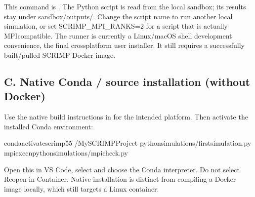 \documentclass[letterpaper,10pt,english]{sphinxmanual}
\begin{document}
\sphinxAtStartPar
This command is . The Python script is read from
the local sandbox; its results stay under sandbox/outputs/. Change the
script name to run another local simulation, or set SCRIMP\_MPI\_RANKS=2
for a script that is actually MPI\sphinxhyphen{}compatible. The runner is currently
a Linux/macOS shell development convenience,  the final
cross\sphinxhyphen{}platform user installer. It still requires a successfully
built/pulled SCRIMP Docker image.


\subsection{C. Native Conda / source installation (without Docker)}
\label{\detokenize{vscode:c-native-conda-source-installation-without-docker}}
\sphinxAtStartPar
Use the native build instructions in {\hyperref[\detokenize{install::doc}]{}} for the intended
platform. Then activate the installed Conda environment:

\begin{sphinxVerbatim}[commandchars=\\\{\}]
condaactivatescrimp55
\PYGZti{}/MySCRIMPProject
pythonsimulations/first\PYGZus{}simulation.py
mpiexec\PYGZhy{}npythonsimulations/mpi\PYGZus{}check.py
\end{sphinxVerbatim}

\sphinxAtStartPar
Open this  in VS Code, select  and choose the Conda interpreter. Do not select
Reopen in Container. Native installation is distinct from compiling
a Docker image locally, which still targets a Linux container.
\end{document}
